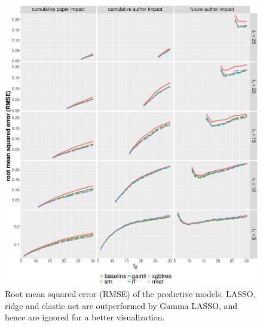 \begin{refsection}
\begin{figure}[ht!]
    \centering
    \includegraphics[width=\textwidth]{figures/pred_model/rmse_diff.eps}
    \caption{Root mean squared error (RMSE) of the predictive models. LASSO, ridge and elastic net are outperformed by Gamma LASSO, and hence are ignored for a better visualization.}
    \label{fig:pred_rmse}
\end{figure}


\end{refsection}
